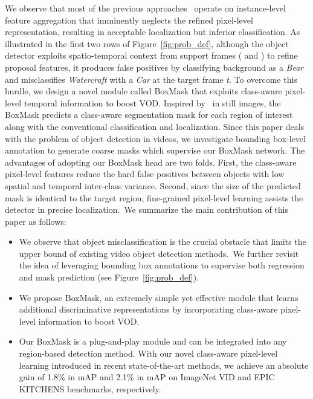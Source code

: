 \documentclass[10pt,twocolumn,letterpaper]{article}
\begin{document}
We observe that most of the previous approaches~\cite{zhu2017flow, wu2019sequence, gong2021temporal, chen2020memory} operate on instance-level feature aggregation that imminently neglects the refined pixel-level representation, resulting in acceptable localization but inferior classification. As illustrated in the first two rows of Figure~\ref{fig:prob_def}, although the object detector exploits spatio-temporal context from support frames ( and ) to refine proposal features, it produces false positives by classifying background as a \textit{Bear} and misclassifies \textit{Watercraft} with a \textit{Car} at the target frame \textit{t}. To overcome this hurdle, we design a novel module called BoxMask that exploits class-aware pixel-level temporal information to boost VOD. Inspired by~\cite{he2017mask} in still images, the BoxMask predicts a class-aware segmentation mask for each region of interest along with the conventional classification and localization. Since this paper deals with the problem of object detection in videos, we investigate bounding box-level annotation to generate coarse masks which supervise our BoxMask network. The advantages of adopting our BoxMask head are two folds. First, the class-aware pixel-level features reduce the hard false positives between objects with low spatial and temporal inter-class variance. Second, since the size of the predicted mask is identical to the target region, fine-grained pixel-level learning assists the detector in precise localization.~We summarize the main contribution of this paper as follows:
\vspace{-5pt}
\begin{itemize}
    \item We observe that object misclassification 
    is the crucial obstacle that limits the upper bound of existing video object detection methods.~We further revisit the idea of leveraging bounding box annotations to supervise both regression and mask prediction (see Figure~\ref{fig:prob_def}).
    \vspace{-5pt}
    \item We propose BoxMask, an extremely simple yet effective module that learns additional discriminative representations by incorporating class-aware pixel-level information to boost VOD.
    \vspace{-5pt}
    \item Our BoxMask is a plug-and-play module and can be integrated into any region-based detection method. With our novel class-aware pixel-level learning introduced in recent state-of-the-art methods, we achieve an absolute gain of 1.8\% in mAP and 2.1\% in mAP on ImageNet VID and EPIC KITCHENS benchmarks, respectively.

\end{itemize}
\end{document}
